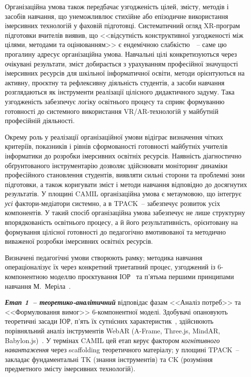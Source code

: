 Організаційна умова також передбачає узгодженість цілей, змісту, методів і засобів навчання, що унеможливлює стихійне або епізодичне використання імерсивних технологій у фаховій підготовці. Систематичний огляд XR-програм підготовки вчителів виявив, що <<відсутність конструктивної узгодженості між цілями, методами та оцінюванням>> є ендемічною слабкістю~\cite{Wang2024XRTeacherEd}~-- саме цю прогалину адресує організаційна умова. Навчальні цілі конкретизуються через очікувані результати, зміст добирається з урахуванням професійної значущості імерсивних ресурсів для шкільної інформатичної освіти, методи орієнтуються на активну, проєктну та рефлексивну діяльність студентів, а засоби навчання розглядаються як інструменти реалізації цілісного дидактичного задуму. Така узгодженість забезпечує логіку освітнього процесу та сприяє формуванню готовності до системного використання VR/AR-технологій у майбутній професійній діяльності.

Окрему роль у реалізації організаційної умови відіграє визначення чітких критеріїв, показників і рівнів сформованості готовності майбутніх учителів інформатики до розробки імерсивних освітніх ресурсів. Наявність діагностично обґрунтованого інструментарію дозволяє здійснювати моніторинг динаміки професійного становлення студентів, виявляти сильні сторони та проблемні зони підготовки, а також коригувати зміст і методи навчання відповідно до досягнутих результатів. У площині CAMIL організаційна умова є метаумовою, що інтегрує \emph{усі} фактори-медіатори системно, а в TPACK~-- забезпечує розвиток усіх компонентів. У такий спосіб організаційна умова забезпечує не лише структурну впорядкованість освітнього процесу, а й його результативність, орієнтовану на формування цілісної готовності до педагогічно вмотивованої та методично виваженої розробки імерсивних освітніх ресурсів.

Визначені педагогічні умови створюють рамку; методика навчання операціоналізує їх через конкретний триетапний процес, узгоджений із 6-компонентною моделлю проєктування ІОР~\cite{Semerikov2022IERDesign} та п'ятьма першими принципами навчання М.~Меріла~\cite{KGeneral2020}.

\emph{\textbf{Етап 1~-- теоретико-аналітичний}} відповідає фазам <<Аналіз потреб>> та <<Формулювання вимог>> 6-компонентної моделі. Здобувачі опановують теоретичні засади ІОР, п'ять їх сутнісних характеристик~\cite{Semerikov2022IERDesign}, здійснюють порівняльний аналіз інструментів WebAR (A-Frame, Three.js, MindAR, Babylon.js)~\cite{Shepiliev2020WebAR}. У термінах CAMIL цей етап керує фактором \emph{когнітивного навантаження} через scaffolding теоретичного матеріалу; у площині TPACK~-- закладає фундаментальні TK (знання інструментів) та CK (розуміння предметного змісту імерсивних технологій).

